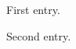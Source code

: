 \documentclass{article}
\begin{document}
\cite{bib:abc}

\begin{thebibliography}{9}
 First entry.

 Second entry.

\end{thebibliography}
\end{document}
